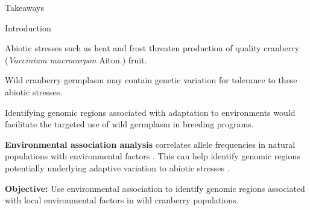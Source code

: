 \documentclass[final]{beamer}
\newlength{\onecolwid}
\begin{document}
\begin{frame}[t]
\begin{columns}[t]
\begin{column}{\onecolwid}
\begin{alertblock}{\Large{Takeaways}}
\end{alertblock}


\begin{block}{Introduction}


Abiotic stresses such as heat and frost threaten production of quality cranberry (\textit{Vaccinium macrocarpon} Aiton.) fruit.

\vspace{0.5cm}

Wild cranberry germplasm may contain genetic variation for tolerance to these abiotic stresses.

\vspace{0.5cm}

Identifying genomic regions associated with adaptation to environments would facilitate the targeted use of wild germplasm in breeding programs.

\vspace{0.5cm}

\textbf{Environmental association analysis} correlates allele frequencies in natural populations with environmental factors \cite{Walsh2018}. This can help identify genomic regions potentially underlying adaptive variation to abiotic stresses \cite{Yoder2014, Anderson2016, Lei2019}.

\vspace{0.5cm}

\textbf{Objective:} Use environmental association to identify genomic regions associated with local environmental factors in wild cranberry populations.


\end{block}

\vspace{2cm}



\end{column}
\end{columns}
\end{frame}
\end{document}
